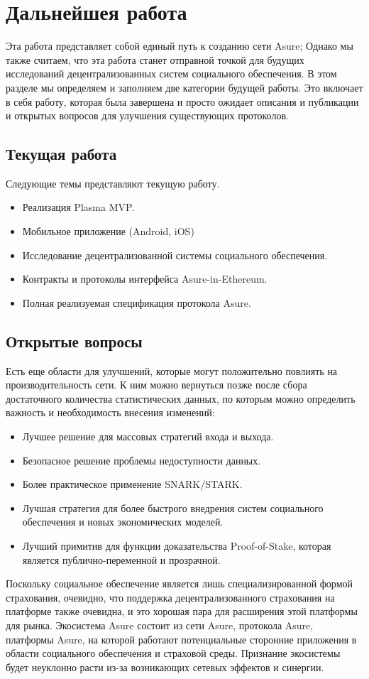 \section{Дальнейшея работа}

Эта работа представляет собой единый путь к созданию сети Asure; Однако мы также считаем, что эта работа станет отправной точкой для будущих исследований децентрализованных систем социального обеспечения. В этом разделе мы определяем и заполняем две категории будущей работы. Это включает в себя работу, которая была завершена и просто ожидает описания и публикации и открытых вопросов для улучшения существующих протоколов.

\subsection{Текущая работа}

Следующие темы представляют текущую работу.

\begin{itemize}
\item Реализация Plasma MVP.
\item Мобильное приложение (Android, iOS)
\item Исследование децентрализованной системы социального обеспечения.
\item Контракты и протоколы интерфейса Asure-in-Ethereum.
\item Полная реализуемая спецификация протокола Asure.
\end{itemize}

\subsection{Открытые вопросы}
Есть еще области для улучшений, которые могут положительно повлиять на производительность сети. К ним можно вернуться позже после сбора достаточного количества статистических данных, по которым можно определить важность и необходимость внесения изменений:

\begin{itemize}
\item Лучшее решение для массовых стратегий входа и выхода.
\item Безопасное решение проблемы недоступности данных.
\item Более практическое применение SNARK/STARK.
\item Лучшая стратегия для более быстрого внедрения систем социального обеспечения и новых экономических моделей.
\item Лучший примитив для функции доказательства Proof-of-Stake, которая является публично-переменной и прозрачной.
\end{itemize}

Поскольку социальное обеспечение является лишь специализированной формой страхования, очевидно, что поддержка децентрализованного страхования на платформе также очевидна, и это хорошая пара для расширения этой платформы для рынка. Экосистема Asure состоит из сети Asure, протокола Asure, платформы Asure, на которой работают потенциальные сторонние приложения в области социального обеспечения и страховой среды. Признание экосистемы будет неуклонно расти из-за возникающих сетевых эффектов и синергии. 